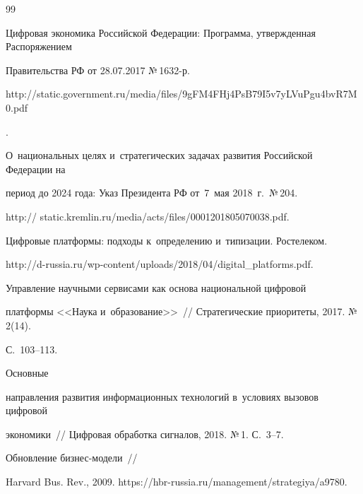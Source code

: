 {\small\frenchspacing


{%




\begin{thebibliography}{99}




Цифровая экономика Российской Федерации: Программа, утверж\-ден\-ная Распоряжением 


Правительства РФ от 28.07.2017 №\,1632-р. {\sf 


http://static.government.\linebreak ru/media/files/9gFM4FHj4PsB79I5v7yLVuPgu4bvR7M0.pdf}.




О~национальных целях и~стратегических задачах развития Российской Федерации на 


период до 2024 года: Указ Президента РФ от~7~мая 2018~г.\ №\,204. {\sf 


http:// static.kremlin.ru/media/acts/files/0001201805070038.pdf.}




Цифровые платформы: подходы к~определению и~типизации. Ростелеком. {\sf  


http://\linebreak d-russia.ru/wp-content/uploads/2018/04/digital\_platforms.pdf.}




 Управление научными сервисами как основа национальной цифровой 


платформы <<Наука и~образование>>~/\!\!/ Стратегические приоритеты, 2017. №\,2(14). 


С.~103--113.




 Основные 


направления развития информационных технологий в~условиях вызовов цифровой 


экономики~/\!\!/ Цифровая обработка сигналов, 2018. №\,1. С.~3--7.




 Обновление биз\-нес-мо\-де\-ли~/\!\!/ 


Harvard Bus. Rev., 2009. {\sf https://hbr-russia.ru/management/strategiya/a9780}.



\end{thebibliography}}}

